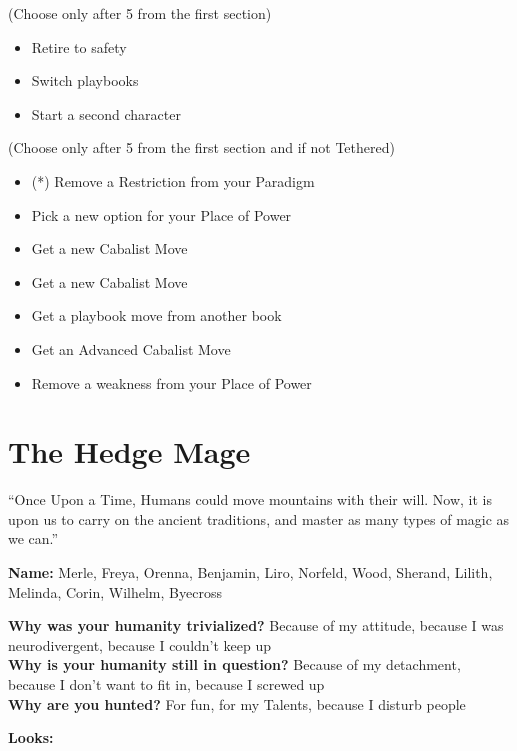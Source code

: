 \documentclass[
  oneside,
  statementpaper,
  9pt]{memoir}
\begin{document}
(Choose only after 5 from the first section)

\begin{itemize}
\tightlist
\item
  Retire to safety
\item
  Switch playbooks
\item
  Start a second character
\end{itemize}

(Choose only after 5 from the first section and if not Tethered)

\begin{itemize}
\tightlist
\item
  (*) Remove a Restriction from your Paradigm
\item
  Pick a new option for your Place of Power
\item
  Get a new Cabalist Move
\item
  Get a new Cabalist Move
\item
  Get a playbook move from another book
\item
  Get an Advanced Cabalist Move
\item
  Remove a weakness from your Place of Power
\end{itemize}

\newpage

\hypertarget{the-hedge-mage}{%
\section{The Hedge Mage}\label{the-hedge-mage}}

``Once Upon a Time, Humans could move mountains with their will. Now, it
is upon us to carry on the ancient traditions, and master as many types
of magic as we can.''

\textbf{Name:} Merle, Freya, Orenna, Benjamin, Liro, Norfeld, Wood,
Sherand, Lilith, Melinda, Corin, Wilhelm, Byecross

\textbf{Why was your humanity trivialized?} Because of my attitude,
because I was neurodivergent, because I couldn't keep up\\
\textbf{Why is your humanity still in question?} Because of my
detachment, because I don't want to fit in, because I screwed up\\
\textbf{Why are you hunted?} For fun, for my Talents, because I disturb
people

\textbf{Looks:}
\end{document}
